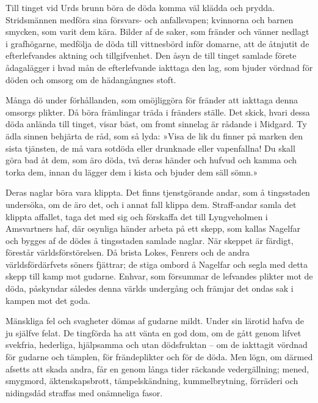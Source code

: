 Till tinget vid Urds brunn böra de döda komma väl klädda och prydda.
Stridsmännen medföra sina försvars- och anfallsvapen; kvinnorna och
barnen smycken, som varit dem kära. Bilder af de saker, som fränder och
vänner nedlagt i grafhögarne, medfölja de döda till vittnesbörd inför
domarne, att de åtnjutit de efterlefvandes aktning och tillgifvenhet.
Den åsyn de till tinget samlade förete ådagalägger i hvad mån de
efterlefvande iakttaga den lag, som bjuder vördnad för döden och omsorg
om de hädangångnes stoft.

Många dö under förhållanden, som omöjliggöra för fränder att iakttaga
denna omsorgs plikter. Då böra främlingar träda i fränders ställe. Det
skick, hvari dessa döda anlända till tinget, visar bäst, om fromt
sinnelag är rådande i Midgard. Ty ädla sinnen behjärta de råd, som så
lyda: »Visa
\protect\hypertarget{lb1625905.xhtmlux5cux23start184}{}{}\protect\hypertarget{lb1625905.xhtmlux5cux23start184-a}{}{}\protect\hypertarget{lb1625905.xhtmlux5cux23start184-b}{}{}\protect\hypertarget{lb1625905.xhtmlux5cux23start184-c}{}{}\protect\hypertarget{lb1625905.xhtmlux5cux23start184-d}{}{}
de lik du finner på marken den sista tjänsten, de må vara sotdöda eller
drunknade eller vapenfallna! Du skall göra bad åt dem, som äro döda, två
deras händer och hufvud och kamma och torka dem, innan du lägger dem i
kista och bjuder dem säll sömn.»

Deras naglar böra vara klippta. Det finns tjenstgörande andar, som å
tingsstaden undersöka, om de äro det, och i annat fall klippa dem.
Straff-andar samla det klippta affallet, taga det med sig och förskaffa
det till Lyngveholmen i Amsvartners haf, där osynliga händer arbeta på
ett skepp, som kallas Nagelfar och bygges af de dödes å tingsstaden
samlade naglar. När skeppet är färdigt, förestår världsförstörelsen. Då
brista Lokes, Fenrers och de andra världsfördärfvets söners fjättrar; de
stiga ombord å Nagelfar och segla med detta skepp till kamp mot gudarne.
Enhvar, som försummar de lefvandes plikter mot de döda, påskyndar
således denna världs undergång och främjar det ondas sak i kampen mot
det goda.

Mänskliga fel och svagheter dömas af gudarne mildt. Under sin lärotid
hafva de ju själfve felat. De tingförda ha att vänta en god dom, om de
gått genom lifvet svekfria, hederliga, hjälpsamma och utan dödsfruktan
-- om de iakttagit vördnad för gudarne och tämplen, för frändeplikter
och för de döda. Men lögn, om därmed afsetts att skada andra, får en
genom långa tider räckande vedergällning; mened, smygmord,
äktenskapsbrott, tämpelskändning, kummelbrytning, förräderi och
nidingsdåd straffas med onämneliga fasor.

